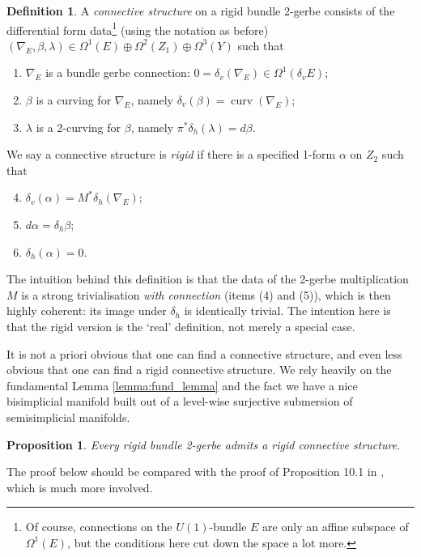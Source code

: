 \documentclass[12pt]{amsart}
\theoremstyle{plain}
\newtheorem{proposition}[theorem]{Proposition}
\theoremstyle{definition}
\newtheorem{definition}[theorem]{Definition}
\theoremstyle{remark}
\numberwithin{equation}{section}
\DeclareMathOperator{\curv}{curv}
\newcommand{\<}{\langle}
\renewcommand{\>}{\rangle}
\begin{document}
\begin{definition}\label{def:conn_structure}
A \emph{connective structure} on a rigid bundle 2-gerbe consists of the differential form data\footnote{Of course, connections on the $U(1)$-bundle $E$ are only an affine subspace of $\Omega^1(E)$, but the conditions here cut down the space a lot more.} (using the notation as before) $(\nabla_E,\beta,\lambda) \in \Omega^1(E) \oplus \Omega^2(Z_1) \oplus  \Omega^3(Y)$ such that
\begin{enumerate}
\item $\nabla_E$ is a bundle gerbe connection: $0=\delta_v(\nabla_E) \in \Omega^1(\delta_vE)$;
\item $\beta$ is a curving for $\nabla_E$, namely $\delta_v(\beta) = \curv(\nabla_E)$;
\item $\lambda$ is a 2-curving for $\beta$, namely $\pi^*\delta_h(\lambda) = d\beta$.
\end{enumerate}
We say a connective structure is \emph{rigid} if there is a specified 1-form $\alpha$ on $Z_2$ such that
\begin{enumerate}\setcounter{enumi}{3}
\item $\delta_v(\alpha) = M^*\delta_h(\nabla_E)$;
\item $d\alpha = \delta_h\beta$;
\item $\delta_h(\alpha)=0$.
\end{enumerate}
\end{definition}

The intuition behind this definition is that the data of the 2-gerbe multiplication $M$ is a strong trivialisation \emph{with connection} (items (4) and (5)), which is then highly coherent: its image under $\delta_h$ is identically trivial.
The intention here is that the rigid version is the `real' definition, not merely a special case.

It is not a priori obvious that one can find a connective structure, and even less obvious that one can find a rigid connective structure.
We rely heavily on the fundamental Lemma \ref{lemma:fund_lemma} and the fact we have a nice bisimplicial manifold built out of a level-wise surjective submersion of semisimplicial manifolds.


\begin{proposition}\label{prop:conn_exist}
Every rigid bundle 2-gerbe admits a rigid connective structure.
\end{proposition}

The proof below should be compared with the proof of Proposition 10.1 in \cite{StevPhD}, which is much more involved.
\end{document}

